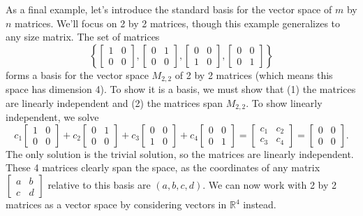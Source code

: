 \begin{example}
As a final example, let's introduce the standard basis for the vector space of $m$ by $n$ matrices. We'll focus on 2 by 2 matrices, though this example generalizes to any size matrix. The set of matrices 
$$\left\{
\begin{bmatrix}
 1 & 0  \\
 0 & 0 
\end{bmatrix},
\begin{bmatrix}
 0 & 1  \\
 0 & 0 
\end{bmatrix},
\begin{bmatrix}
 0 & 0  \\
 1 & 0 
\end{bmatrix},
\begin{bmatrix}
 0 & 0  \\
 0 & 1 
\end{bmatrix}
\right\}$$
forms a basis for the vector space $M_{2,2}$ of 2 by 2 matrices (which means this space has dimension 4).  
To show it is a basis, we must show that (1) the matrices are linearly independent and (2) the matrices span $M_{2,2}$.
To show linearly independent, we solve 
$$c_1
\begin{bmatrix}
 1 & 0  \\
 0 & 0 
\end{bmatrix}
+c_2
\begin{bmatrix}
 0 & 1  \\
 0 & 0 
\end{bmatrix}
+c_3
\begin{bmatrix}
 0 & 0  \\
 1 & 0 
\end{bmatrix}
+c_4
\begin{bmatrix}
 0 & 0  \\
 0 & 1 
\end{bmatrix}
=
\begin{bmatrix}
 c_1 & c_2  \\
 c_3 & c_4 
\end{bmatrix}
=\begin{bmatrix}
 0 & 0  \\
 0 & 0 
\end{bmatrix}
.$$
The only solution is the trivial solution, so the matrices are linearly independent. 
These 4 matrices clearly span the space, as the coordinates of any matrix 
$\begin{bmatrix}
 a & b  \\
 c & d 
\end{bmatrix}$ 
relative to this basis are $(a,b,c,d)$.
We can now work with 2 by 2 matrices as a vector space by considering vectors in ${\mathbb{R}}^4$ instead. 
\end{example}

